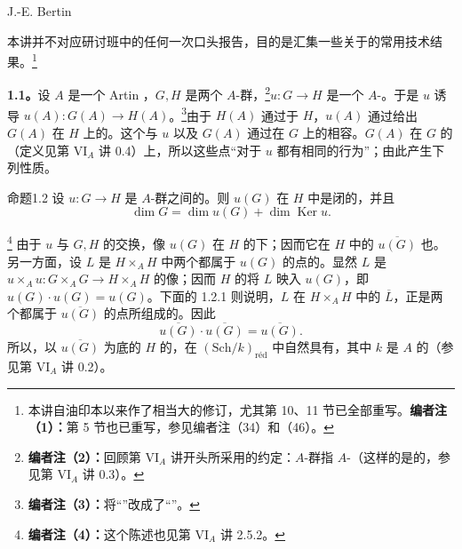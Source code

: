 \begin{center}J.-E. Bertin\end{center}
本讲并不对应研讨班中的任何一次口头报告，目的是汇集一些关于的常用技术结果。\footnote{本讲自油印本以来作了相当大的修订，尤其第 10、11 节已全部重写。\textbf{编者注（1）：}第 5 节也已重写，参见编者注（34）和（46）。}

\textbf{1.1。}设 $A$ 是一个 Artin ，$G,H$ 是两个 $A$-群，\footnote{\textbf{编者注（2）：}回顾第 VI$_A$ 讲开头所采用的约定：$A$-群指 $A$-（这样的是的，参见第 VI$_A$ 讲 0.3）。}$u:G\to H$ 是一个 $A$-。于是 $u$ 诱导 $u(A):G(A)\to H(A)$。\footnote{\textbf{编者注（3）：}将“”改成了“”。}由于 $H(A)$ 通过于 $H$，$u(A)$ 通过给出 $G(A)$ 在 $H$ 上的。这个与 $u$ 以及 $G(A)$ 通过在 $G$ 上的相容。$G(A)$ 在 $G$ 的（定义见第 VI$_A$ 讲 0.4）上，所以这些点“对于 $u$ 都有相同的行为”；由此产生下列性质。
\begin{SGAresult}{命题}{1.2}
设 $u:G\to H$ 是 $A$-群之间的。则 $u(G)$ 在 $H$ 中是闭的，并且
\[
\dim G=\dim u(G)+\dim\operatorname{Ker}u.
\]
\end{SGAresult}
\footnote{\textbf{编者注（4）：}这个陈述也见第 VI$_A$ 讲 2.5.2。}
由于 $u$ 与 $G,H$ 的交换，像 $u(G)$ 在 $H$ 的下；因而它在 $H$ 中的 $\overline{u(G)}$ 也。另一方面，设 $L$ 是 $H\times_A H$ 中两个都属于 $u(G)$ 的点的。显然 $L$ 是
$u\times_Au:G\times_AG\to H\times_AH$ 的像；因而 $H$ 的将 $L$ 映入 $u(G)$，即 $u(G)\cdot u(G)=u(G)$。下面的 1.2.1 则说明，$L$ 在 $H\times_AH$ 中的 $\overline L$，正是两个都属于 $\overline{u(G)}$ 的点所组成的。因此
\[
\overline{u(G)}\cdot\overline{u(G)}=\overline{u(G)}.
\]
所以，以 $\overline{u(G)}$ 为底的 $H$ 的，在 $(\mathrm{Sch}/k)_{\mathrm{r\text{é}d}}$ 中自然具有，其中 $k$ 是 $A$ 的（参见第 VI$_A$ 讲 0.2）。

